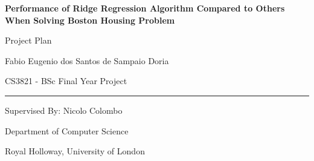 \begin{center}
    \textbf{\Large Performance of Ridge Regression Algorithm Compared to Others When Solving Boston Housing Problem}
        
    \vspace{1.5cm}
    Project Plan

    Fabio Eugenio dos Santos de Sampaio Doria
        
    CS3821 - BSc Final Year Project
        
    \rule{13cm}{0.4pt}

    Supervised By: Nicolo Colombo
        
    Department of Computer Science
        
    Royal Holloway, University of London

\end{center}

